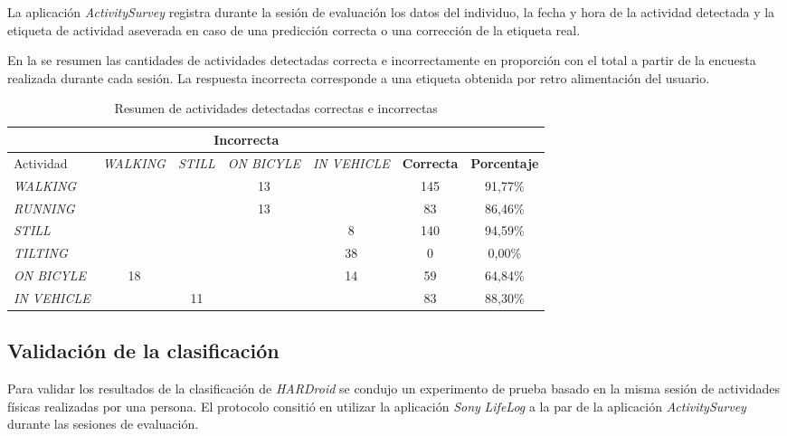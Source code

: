 La aplicación \emph{ActivitySurvey} registra durante la sesión de
evaluación los datos del individuo, la fecha y hora de la actividad
detectada y la etiqueta de actividad aseverada en caso de una predicción
correcta o una corrección de la etiqueta real. 

En la  se resumen las cantidades de actividades
detectadas correcta e incorrectamente en proporción con el total a
partir de la encuesta realizada durante cada sesión. La respuesta
incorrecta corresponde a una etiqueta obtenida por retro alimentación
del usuario.

\begin{table}[h]
\begin{centering}
\begin{tabular}{|l|c|c|c|c|c|c|}
\cline{2-5} 
\multicolumn{1}{l|}{} & \multicolumn{4}{c|}{\textbf{Incorrecta}} & \multicolumn{1}{c}{} & \multicolumn{1}{c}{}\tabularnewline
\hline 
Actividad & \emph{\footnotesize{}WALKING} & \emph{\footnotesize{}STILL} & \emph{\footnotesize{}ON BICYLE} & \emph{\footnotesize{}IN VEHICLE} & \textbf{\small{}Correcta} & \textbf{\small{}Porcentaje}\tabularnewline
\hline 
\hline 
\emph{\footnotesize{}WALKING} &  &  & 13 &  & 145 & 91,77\%\tabularnewline
\hline 
\emph{\footnotesize{}RUNNING} &  &  & 13 &  & 83 & 86,46\%\tabularnewline
\hline 
\emph{\footnotesize{}STILL} &  &  &  & 8 & 140 & 94,59\%\tabularnewline
\hline 
\emph{\footnotesize{}TILTING} &  &  &  & 38 & 0 & 0,00\%\tabularnewline
\hline 
\emph{\footnotesize{}ON BICYLE} & 18 &  &  & 14 & 59 & 64,84\%\tabularnewline
\hline 
\emph{\footnotesize{}IN VEHICLE} &  & 11 &  &  & 83 & 88,30\%\tabularnewline
\hline 
\end{tabular}
\par\end{centering}
\caption[Actividades correctas e incorrectas]{\label{tab6:vencuesta}Resumen de actividades detectadas correctas
e incorrectas}
\end{table}


\subsection{Validación de la clasificación}

Para validar los resultados de la clasificación de \emph{HARDroid
}se condujo un experimento de prueba basado en la misma sesión de
actividades físicas realizadas por una persona. El protocolo consitió
en utilizar la aplicación \emph{Sony} \emph{LifeLog} a la par de la
aplicación \emph{ActivitySurvey} durante las sesiones de evaluación. 

